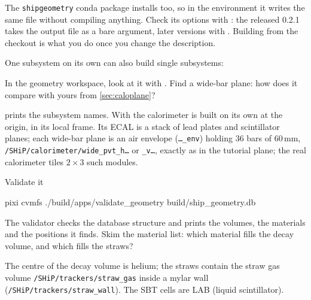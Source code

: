 \begin{note}
The \texttt{shipgeometry} conda package installs  too,
so in the  environment it writes the same file without compiling
anything. Check its options with : the released
0.2.1 takes the output file as a bare argument, later versions with
. Building from the  checkout is what you do once you
change the description.
\end{note}

\begin{exercise}{One subsystem on its own}
 can also build single subsystems:
In the geometry workspace, look at it with .
Find a wide-bar plane: how does it compare with yours from \cref{sec:caloplane}?
\end{exercise}

\begin{solution}
 prints the subsystem names. With  the
calorimeter is built on its own at the origin, in its local frame. Its ECAL
is a stack of lead plates and scintillator planes; each wide-bar plane is an
air envelope (\texttt{\ldots\_env}) holding 36 bars of 60\,mm,
\texttt{/SHiP/calorimeter/wide\_pvt\_h\ldots} or \texttt{\_v\ldots}, exactly
as in the tutorial plane; the real calorimeter tiles $2\times3$ such modules.
\end{solution}

\begin{exercise}{Validate it}
\begin{shell}
pixi cvmfs ./build/apps/validate_geometry build/ship_geometry.db
\end{shell}
The validator checks the database structure and prints the volumes, the
materials and the positions it finds. Skim the material list: which material
fills the decay volume, and which fills the straws?
\end{exercise}

\begin{solution}
The centre of the decay volume is helium; the straws contain the straw gas
volume \texttt{/SHiP/trackers/straw\_gas} inside a mylar wall
(\texttt{/SHiP/trackers/straw\_wall}). The SBT cells are LAB (liquid
scintillator).
\end{solution}


